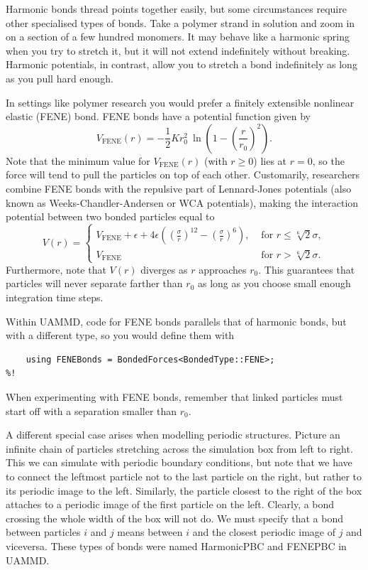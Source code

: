 Harmonic bonds thread points together easily, but some circumstances require
other specialised types of bonds. Take a polymer strand in solution and zoom in
on a section of a few hundred monomers. It may behave like a harmonic spring
when you try to stretch it, but it will not extend indefinitely without
breaking. Harmonic potentials, in contrast, allow you to stretch a bond
indefinitely as long as you pull hard enough.

In settings like polymer research you would prefer a finitely extensible
nonlinear  elastic (FENE) bond. FENE bonds have a potential function given by
\begin{equation*}
  V_\text{FENE}(r) = -\frac{1}{2} K r_0^2\ 
                \ln\left(1 - \left(\frac{r}{r_0}\right)^2\right).
\end{equation*}
Note that the minimum value for $V_\text{FENE}(r)$ (with $r \geq 0$) lies at $r 
= 0$, so the force will tend to pull the particles on top of each other. 
Customarily, researchers combine FENE bonds with the repulsive part of 
Lennard-Jones potentials (also known as Weeks-Chandler-Andersen or WCA 
potentials), making the interaction potential between two bonded particles equal 
to
\begin{equation*}
  V(r) =
    \begin{cases}
         V_\text{FENE}
         + \epsilon
         + 4\epsilon\left(\left(\frac{\sigma}{r}\right)^{12}
                        - \left(\frac{\sigma}{r}\right)^6\right),
         & \text{ for } r \leq \sqrt[6]{2} \sigma, \\
         V_\text{FENE}
         & \text{ for } r > \sqrt[6]{2} \sigma.
    \end{cases}
\end{equation*}
Furthermore, note that $V(r)$ diverges as $r$ approaches $r_0$. This guarantees
that particles will never separate farther than $r_0$ as long as you choose
small enough integration time steps.

Within UAMMD, code for FENE bonds parallels that of harmonic bonds, but with a
different type, so you would define them with
\begin{lstlisting}
    using FENEBonds = BondedForces<BondedType::FENE>;
%!
\end{lstlisting}
When experimenting with FENE bonds, remember that linked particles must start
off with a separation smaller than $r_0$.

A different special case arises when modelling periodic structures. Picture an
infinite chain of particles stretching across the simulation box from left to
right. This we can simulate with periodic boundary conditions, but note that we
have to connect the leftmost particle not to the last particle on the right, but
rather to its periodic image to the left. Similarly, the particle closest to the
right of the box attaches to a periodic image of the first particle on the left.
Clearly, a bond crossing the whole width of the box will not do. We must specify
that a bond between particles $i$ and $j$ means between $i$ and the closest
periodic image of $j$ and viceversa. These types of bonds were named HarmonicPBC
and FENEPBC in UAMMD.

